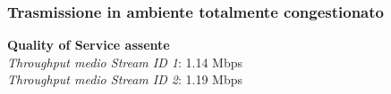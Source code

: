 \documentclass[aspectratio=169]{beamer}
\begin{document}
\begin{frame}
    \frametitle{Trasmissione in ambiente totalmente congestionato}
    \centering
    \hspace{0.05\textwidth} %
    \begin{minipage}{0.9\textwidth}
        \begin{minipage}{0.45\textwidth}
            \textbf{Quality of Service assente}\\
            \textit{Throughput medio Stream ID 1}: 1.14 Mbps\\
            \textit{Throughput medio Stream ID 2}: 1.19 Mbps\\
            
            \vspace{1cm}
            

\end{minipage}
\end{minipage}
\end{frame}
\end{document}

